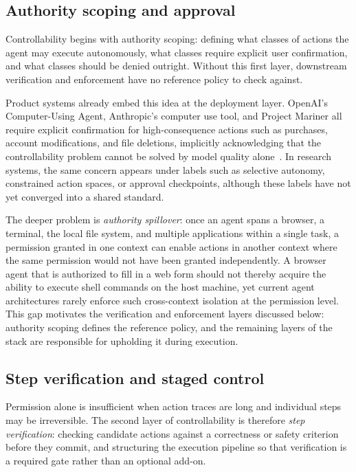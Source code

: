\subsection{Authority scoping and approval}

Controllability begins with authority scoping: defining what classes of actions the agent may execute autonomously, what classes require explicit user confirmation, and what classes should be denied outright. Without this first layer, downstream verification and enforcement have no reference policy to check against.

Product systems already embed this idea at the deployment layer. OpenAI's Computer-Using Agent, Anthropic's computer use tool, and Project Mariner all require explicit confirmation for high-consequence actions such as purchases, account modifications, and file deletions, implicitly acknowledging that the controllability problem cannot be solved by model quality alone~\cite{openai2025cua,anthropic2025computeruse,google2026mariner}. In research systems, the same concern appears under labels such as selective autonomy, constrained action spaces, or approval checkpoints, although these labels have not yet converged into a shared standard.

The deeper problem is \emph{authority spillover}: once an agent spans a browser, a terminal, the local file system, and multiple applications within a single task, a permission granted in one context can enable actions in another context where the same permission would not have been granted independently. A browser agent that is authorized to fill in a web form should not thereby acquire the ability to execute shell commands on the host machine, yet current agent architectures rarely enforce such cross-context isolation at the permission level. This gap motivates the verification and enforcement layers discussed below: authority scoping defines the reference policy, and the remaining layers of the stack are responsible for upholding it during execution.

\subsection{Step verification and staged control}

Permission alone is insufficient when action traces are long and individual steps may be irreversible. The second layer of controllability is therefore \emph{step verification}: checking candidate actions against a correctness or safety criterion before they commit, and structuring the execution pipeline so that verification is a required gate rather than an optional add-on.

